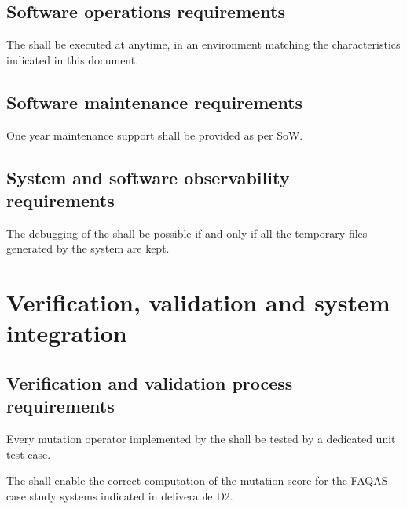 \section{Software operations requirements}

\RQ{} The \FAQAS shall be executed at anytime,
in an environment matching the characteristics indicated in this document.

\section{Software maintenance requirements}

\RQ{} One year maintenance support shall be provided as per SoW.

\section{System and software observability requirements}

\RQ{} The debugging of the \FAQAS shall be possible if and only if
all the temporary files generated by the system are kept.

\chapter{Verification, validation and system integration}
 \section{Verification and validation process requirements}

\RQ{} Every mutation operator implemented by the \FAQAS shall be tested by a dedicated unit test case.




 \RQ{} The \FAQAS shall enable the correct computation of the mutation score for the FAQAS case study systems indicated in deliverable D2.


